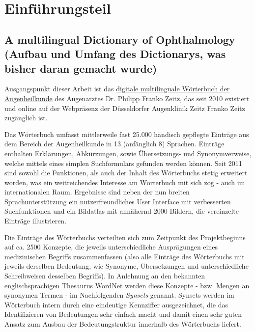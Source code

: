 \documentclass[pagesize,DIV=calc,12pt,draft]{scrreprt}
\begin{document}

\chapter{Einführungsteil}

\section{A multilingual Dictionary of Ophthalmology (Aufbau und
Umfang des Dictionarys, was bisher daran gemacht wurde)}

Ausgangspunkt dieser Arbeit ist das
\href{http://www.zeitzfrankozeitz.de/index.php/fachwoerterbuch.html}{digitale
multilinguale Wörterbuch der Augenheilkunde} des Augenarztes Dr. Philipp
Franko Zeitz, das seit 2010 existiert und online auf der Webpräsenz der
Düsseldorfer Augenklinik Zeitz Franko Zeitz zugänglich ist.

Das Wörterbuch umfasst mittlerweile fast 25.000 händisch gepflegte
Einträge aus dem Bereich der Augenheilkunde in 13 (anfänglich 8)
Sprachen. Einträge enthalten Erklärungen, Abkürzungen, sowie
Übersetzungs- und Synonymverweise, welche mittels eines simplen
Suchformulars gefunden werden können. Seit 2011 sind sowohl die
Funktionen, als auch der Inhalt des Wörterbuchs stetig erweitert worden,
was ein weitreichendes Interesse am Wörterbuch mit sich zog - auch im
internationalen Raum. Ergebnisse sind neben der nun breiten
Sprachunterstützung ein nutzerfreundliches User Interface mit
verbesserten Suchfunktionen und ein Bildatlas mit annähernd 2000
Bildern, die vereinzelte Einträge illustrieren.

Die Einträge des Wörterbuchs verteilten sich zum Zeitpunkt des
Projektbeginns auf ca. 2500 Konzepte, die jeweils unterschiedliche
Ausprägungen eines medizinischen Begriffs zusammenfassen (also alle
Einträge des Wörterbuchs mit jeweils derselben Bedeutung, wie Synonyme,
Übersetzungen und unterschiedliche Schreibweisen desselben Begriffs). In
Anlehnung an den bekannten englischsprachigen Thesaurus WordNet werden
diese Konzepte - bzw. Mengen an synonymen Termen - im Nachfolgenden
\emph{Synsets} genannt. Synsets werden im Wörterbuch intern durch eine
eindeutige Kennziffer ausgezeichnet, die das Identifizieren von
Bedeutungen sehr einfach macht und damit einen sehr guten Ansatz zum
Ausbau der Bedeutungstruktur innerhalb des Wörterbuchs liefert.
\end{document}
